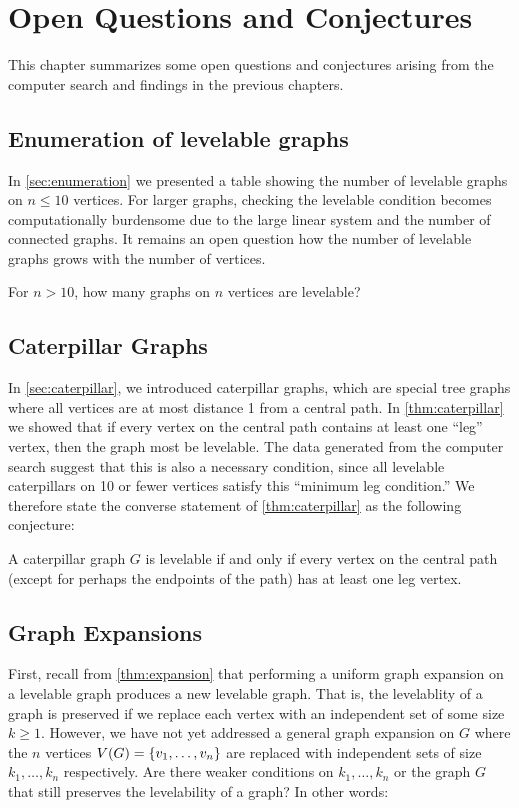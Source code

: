 
\chapter{Open Questions and Conjectures}
\label{ch:conjectures}

This chapter summarizes some open questions and conjectures arising from the computer search and findings in the previous chapters.

\section{Enumeration of levelable graphs} In \autoref{sec:enumeration} we presented a table showing the number of levelable graphs on $n \leq 10$ vertices. For larger graphs, checking the levelable condition becomes computationally burdensome due to the large linear system and the number of connected graphs. It remains an open question how the number of levelable graphs grows with the number of vertices.

\begin{question}
For $n > 10$, how many graphs on $n$ vertices are levelable?
\end{question}

\section{Caterpillar Graphs} In \autoref{sec:caterpillar}, we introduced caterpillar graphs, which are special tree graphs where all vertices are at most distance 1 from a central path. In \autoref{thm:caterpillar} we showed that if every vertex on the central path contains at least one ``leg'' vertex, then the graph most be levelable. The data generated from the computer search suggest that this is also a necessary condition, since all levelable caterpillars on 10 or fewer vertices satisfy this ``minimum leg condition.'' We therefore state the converse statement of \autoref{thm:caterpillar} as the following conjecture:

\begin{conjecture}
A caterpillar graph $G$ is levelable if and only if every vertex on the central path (except for perhaps the endpoints of the path) has at least one leg vertex. 
\end{conjecture}

\section{Graph Expansions}
First, recall from \autoref{thm:expansion} that performing a uniform graph expansion on a levelable graph produces a new levelable graph. That is, the levelablity of a graph is preserved if we replace each vertex with an independent set of some size $k \geq 1$. However, we have not yet addressed a general graph expansion on $G$ where the $n$ vertices $V(G) = \{ v_1, \dots, v_n \}$ are replaced with independent sets of size $k_1, \dots, k_n$ respectively. Are there weaker conditions on $k_1, \dots, k_n$ or the graph $G$ that still preserves the levelability of a graph? In other words:

